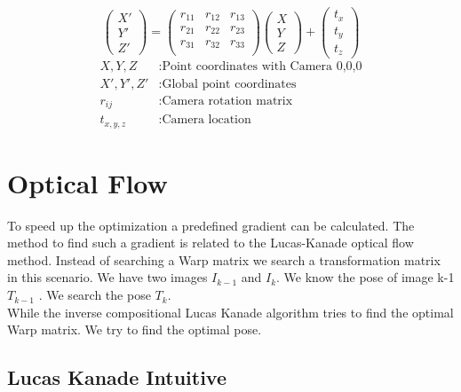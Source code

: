 \documentclass[11pt,a4paper,titlepage,oneside]{report}
\begin{document}
\begin{equation}\label{eq:depth_global}
  \begin{pmatrix}
    X'\\
    Y'\\
    Z'
  \end{pmatrix}=
  \begin{pmatrix}
    r_{11} & r_{12} & r_{13}\\
    r_{21} & r_{22} & r_{23}\\
    r_{31} & r_{32} & r_{33}\\
  \end{pmatrix}
  \begin{pmatrix}
    X\\
    Y\\
    Z
  \end{pmatrix}
  +\begin{pmatrix}
    t_x\\
    t_y\\
    t_z
  \end{pmatrix}
\end{equation}
\begin{align*}
  X,Y,Z      &: \text{Point coordinates with Camera 0,0,0}\\
  X',Y',Z'  &: \text{Global point coordinates}\\
  r_{ij}    &: \text{Camera rotation matrix}\\
  t_{x,y,z}  &: \text{Camera location}
\end{align*}



\chapter{Optical Flow}\label{ch:opt_flow}
To speed up the optimization a predefined gradient can be calculated. The method to find such a gradient is related to the Lucas-Kanade optical flow method. Instead of searching a Warp matrix we search a transformation matrix in this scenario. We have two images $I_{k-1}$ and $I_{k}$. We know the pose of image k-1 $T_{k-1}$ . We search the pose $T_k$.\\
While the inverse compositional Lucas Kanade algorithm tries to find the optimal Warp matrix. We try to find the optimal pose.
\section{Lucas Kanade Intuitive}
\end{document}
